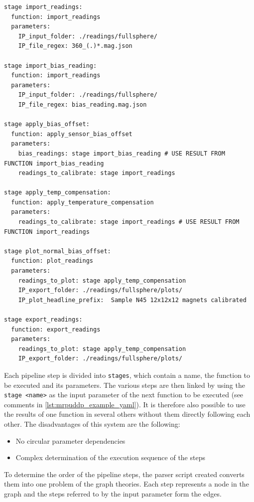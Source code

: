 \begin{lstlisting}[caption={Example User Defined Processing Pipeline}, label=lst:mrpuddp_example_yaml]
stage import_readings:
  function: import_readings
  parameters:
    IP_input_folder: ./readings/fullsphere/
    IP_file_regex: 360_(.)*.mag.json

stage import_bias_reading:
  function: import_readings
  parameters:
    IP_input_folder: ./readings/fullsphere/
    IP_file_regex: bias_reading.mag.json

stage apply_bias_offset:
  function: apply_sensor_bias_offset
  parameters:
    bias_readings: stage import_bias_reading # USE RESULT FROM FUNCTION import_bias_reading
    readings_to_calibrate: stage import_readings

stage apply_temp_compensation:
  function: apply_temperature_compensation
  parameters:
    readings_to_calibrate: stage import_readings # USE RESULT FROM FUNCTION import_readings

stage plot_normal_bias_offset:
  function: plot_readings
  parameters:
    readings_to_plot: stage apply_temp_compensation
    IP_export_folder: ./readings/fullsphere/plots/
    IP_plot_headline_prefix:  Sample N45 12x12x12 magnets calibrated

stage export_readings:
  function: export_readings
  parameters:
    readings_to_plot: stage apply_temp_compensation
    IP_export_folder: ./readings/fullsphere/plots/
\end{lstlisting}

Each pipeline step is divided into \passthrough{\lstinline!stages!},
which contain a name, the function to be executed and its parameters.
The various steps are then linked by using the
\passthrough{\lstinline!stage <name>!} as the input parameter of the
next function to be executed (see comments in
\ref{lst:mrpuddp_example_yaml}). It is therefore also possible to use
the results of one function in several others without them directly
following each other. The disadvantages of this system are the
following:

\begin{itemize}
\tightlist
\item
  No circular parameter dependencies
\item
  Complex determination of the execution sequence of the steps
\end{itemize}

To determine the order of the pipeline steps, the parser script created
converts them into one problem of the graph theories. Each step
represents a node in the graph and the steps referred to by the input
parameter form the edges.

